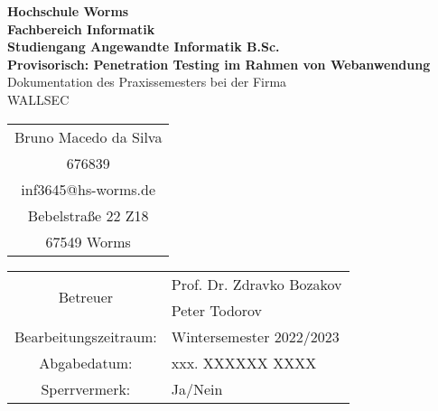 \begin{titlepage}
    \vspace*{2mm}
    \begin{center}
        \Large
        \textbf{Hochschule Worms}\\
        \textbf{Fachbereich Informatik}\\
        \textbf{Studiengang Angewandte Informatik B.Sc.}\\
        \vspace{1cm}
        \textbf{Provisorisch: Penetration Testing im Rahmen von Webanwendung}\\
        \vspace{1cm}
        \large
        Dokumentation des Praxissemesters bei der Firma\\
        \Large{WALLSEC}
        \vspace{2cm}
        \begin {table}[ht]
        \centering
            \begin{tabular}{c}
                Bruno Macedo da Silva  \\ 
                676839                \\
                inf3645@hs-worms.de   \\
                Bebelstraße 22 Z18    \\
                67549 Worms            \\
            \end{tabular}
        \end {table}
        \vspace{2cm}
        \large
        \vspace{1cm}
        \begin{table}[ht]
            \centering
            \begin{tabularx}{\textwidth}{ll}
                \multicolumn{1}{c}{\multirow{2}{*}{Betreuer}} & Prof. Dr. Zdravko Bozakov \\ 
                \multicolumn{1}{c}{} & Peter Todorov \\
                \multicolumn{1}{c}{Bearbeitungszeitraum:} & Wintersemester 2022/2023 \\
                \multicolumn{1}{c}{Abgabedatum:} & xxx. XXXXXX XXXX \\
                \multicolumn{1}{c}{Sperrvermerk:} & Ja/Nein \\
            \end{tabularx}
        \end{table}
    \end{center}
    \normalsize
    \vfill
 


\end{titlepage}